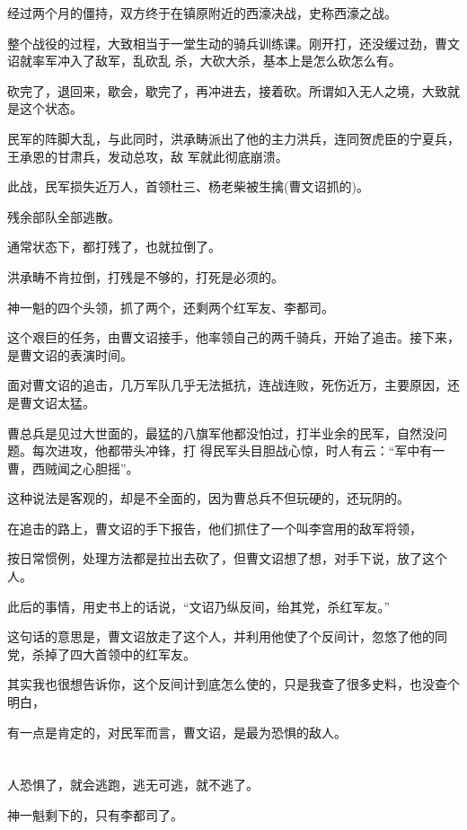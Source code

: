 \documentclass[11pt,a4paper,onecolumn]{article}
\begin{document}
经过两个月的僵持，双方终于在镇原附近的西濠决战，史称西濠之战。

整个战役的过程，大致相当于一堂生动的骑兵训练课。刚开打，还没缓过劲，曹文诏就率军冲入了敌军，乱砍乱
杀，大砍大杀，基本上是怎么砍怎么有。

砍完了，退回来，歇会，歇完了，再冲进去，接着砍。所谓如入无人之境，大致就是这个状态。

民军的阵脚大乱，与此同时，洪承畴派出了他的主力洪兵，连同贺虎臣的宁夏兵，王承恩的甘肃兵，发动总攻，敌
军就此彻底崩溃。

此战，民军损失近万人，首领杜三、杨老柴被生擒(曹文诏抓的)。

残余部队全部逃散。

通常状态下，都打残了，也就拉倒了。

洪承畴不肯拉倒，打残是不够的，打死是必须的。

神一魁的四个头领，抓了两个，还剩两个\myrule 红军友、李都司。

这个艰巨的任务，由曹文诏接手，他率领自己的两千骑兵，开始了追击。接下来，是曹文诏的表演时间。

面对曹文诏的追击，几万军队几乎无法抵抗，连战连败，死伤近万，主要原因，还是曹文诏太猛。

曹总兵是见过大世面的，最猛的八旗军他都没怕过，打半业余的民军，自然没问题。每次进攻，他都带头冲锋，打
得民军头目胆战心惊，时人有云：``军中有一曹，西贼闻之心胆摇''。

这种说法是客观的，却是不全面的，因为曹总兵不但玩硬的，还玩阴的。

在追击的路上，曹文诏的手下报告，他们抓住了一个叫李宫用的敌军将领，

按日常惯例，处理方法都是拉出去砍了，但曹文诏想了想，对手下说，放了这个人。

此后的事情，用史书上的话说，``文诏乃纵反间，绐其党，杀红军友。''

这句话的意思是，曹文诏放走了这个人，并利用他使了个反间计，忽悠了他的同党，杀掉了四大首领中的红军友。

其实我也很想告诉你，这个反间计到底怎么使的，只是我查了很多史料，也没查个明白，

有一点是肯定的，对民军而言，曹文诏，是最为恐惧的敌人。

\section[\thesection]{}

人恐惧了，就会逃跑，逃无可逃，就不逃了。

神一魁剩下的，只有李都司了。
\end{document}
